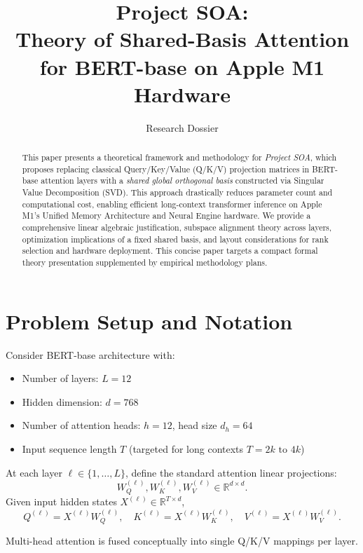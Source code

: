 \documentclass[11pt]{article}
\title{Project SOA:\\
Theory of Shared-Basis Attention for BERT-base on Apple M1 Hardware}
\author{Research Dossier}
\date{}
\theoremstyle{definition}
\begin{document}
\maketitle

\begin{abstract}
This paper presents a theoretical framework and methodology for \emph{Project SOA}, which proposes replacing classical Query/Key/Value (Q/K/V) projection matrices in BERT-base attention layers with a \emph{shared global orthogonal basis} constructed via Singular Value Decomposition (SVD). This approach drastically reduces parameter count and computational cost, enabling efficient long-context transformer inference on Apple M1's Unified Memory Architecture and Neural Engine hardware. We provide a comprehensive linear algebraic justification, subspace alignment theory across layers, optimization implications of a fixed shared basis, and layout considerations for rank selection and hardware deployment. This concise paper targets a compact formal theory presentation supplemented by empirical methodology plans.
\end{abstract}

\tableofcontents

\section{Problem Setup and Notation}

Consider BERT-base architecture with:
\begin{itemize}
    \item Number of layers: \(L = 12\)
    \item Hidden dimension: \(d = 768\)
    \item Number of attention heads: \(h = 12\), head size \(d_h = 64\)
    \item Input sequence length \(T\) (targeted for long contexts \(T = 2k \text{ to } 4k\))
\end{itemize}

At each layer \(\ell \in \{1,\dots,L\}\), define the standard attention linear projections:
\[
W_Q^{(\ell)}, W_K^{(\ell)}, W_V^{(\ell)} \in \mathbb{R}^{d \times d}.
\]
Given input hidden states \(X^{(\ell)} \in \mathbb{R}^{T \times d}\),
\[
Q^{(\ell)} = X^{(\ell)} W_Q^{(\ell)}, \quad
K^{(\ell)} = X^{(\ell)} W_K^{(\ell)}, \quad
V^{(\ell)} = X^{(\ell)} W_V^{(\ell)}.
\]

Multi-head attention is fused conceptually into single Q/K/V mappings per layer.
\end{document}
